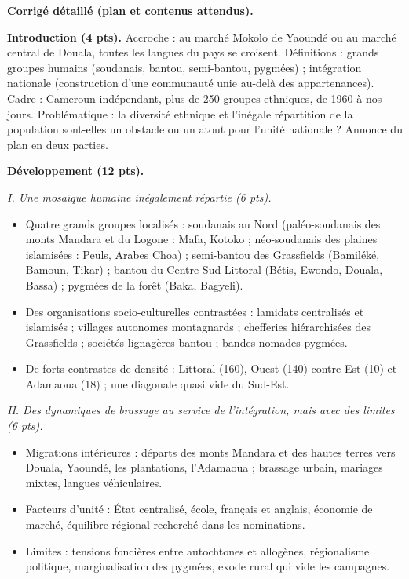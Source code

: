 \documentclass[11pt]{article}
\newcommand{\cle}[1]{{\popxbold\color{popdark}#1}}
\begin{document}
\begin{corrige}
\textbf{Corrigé détaillé (plan et contenus attendus).}

\textbf{Introduction (4 pts).} Accroche : au marché Mokolo de Yaoundé ou au marché central de Douala, toutes les langues du pays se croisent. Définitions : \cle{grands groupes humains} (soudanais, bantou, semi-bantou, pygmées) ; \cle{intégration nationale} (construction d'une communauté unie au-delà des appartenances). Cadre : Cameroun indépendant, plus de 250 groupes ethniques, de 1960 à nos jours. Problématique : la diversité ethnique et l'inégale répartition de la population sont-elles un obstacle ou un atout pour l'unité nationale ? Annonce du plan en deux parties.

\textbf{Développement (12 pts).}

\emph{I. Une mosaïque humaine inégalement répartie (6 pts).}
\begin{itemize}
\item Quatre grands groupes localisés : soudanais au Nord (paléo-soudanais des monts Mandara et du Logone : Mafa, Kotoko ; néo-soudanais des plaines islamisées : Peuls, Arabes Choa) ; semi-bantou des Grassfields (Bamiléké, Bamoun, Tikar) ; bantou du Centre-Sud-Littoral (Bétis, Ewondo, Douala, Bassa) ; pygmées de la forêt (Baka, Bagyeli).
\item Des organisations socio-culturelles contrastées : lamidats centralisés et islamisés ; villages autonomes montagnards ; chefferies hiérarchisées des Grassfields ; sociétés lignagères bantou ; bandes nomades pygmées.
\item De forts contrastes de densité : Littoral (160), Ouest (140) contre Est (10) et Adamaoua (18) ; une diagonale quasi vide du Sud-Est.
\end{itemize}

\emph{II. Des dynamiques de brassage au service de l'intégration, mais avec des limites (6 pts).}
\begin{itemize}
\item Migrations intérieures : départs des monts Mandara et des hautes terres vers Douala, Yaoundé, les plantations, l'Adamaoua ; brassage urbain, mariages mixtes, langues véhiculaires.
\item Facteurs d'unité : État centralisé, école, français et anglais, économie de marché, équilibre régional recherché dans les nominations.
\item Limites : tensions foncières entre autochtones et allogènes, régionalisme politique, marginalisation des pygmées, exode rural qui vide les campagnes.
\end{itemize}


\end{corrige}
\end{document}
